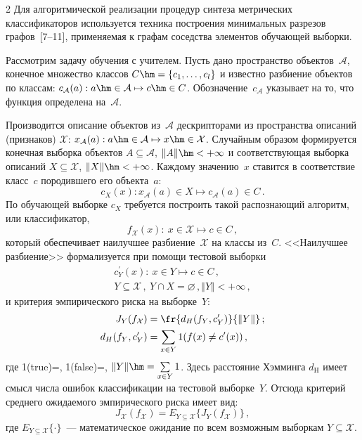 \begin{multicols}{2}
      Для алгоритмической реализации процедур синтеза метрических классификаторов 
используется техника построения минимальных разрезов графов~[7--11], %
применяемая к графам соседства элементов обучающей выборки.
      
      Рассмотрим задачу обучения с учителем. Пусть дано пространство 
объектов~$\mathcal{A}$, конечное множество классов $C\hm=\{c_1, \ldots , c_l\}$ и известно 
разбиение объектов по классам: $c_{\mathcal{A}}(a): a\hm\in\mathcal{A}\mapsto c\hm\in C$. 
Обозначение~$c_{\mathcal{A}}$ указывает на то, что функция определена на~$\mathcal{A}$.

Производится описание объектов из~$\mathcal{A}$ дескрипторами из пространства описаний 
(признаков) $\mathcal{X}$: $x_{\mathcal{A}}(a): a\hm\in\mathcal{A}\mapsto 
x\hm\in\mathcal{X}$. Случайным образом формируется конечная выборка объектов $A\subseteq 
\mathcal{A}$, $\Vert A\Vert \hm<+\infty$ и соответствующая выборка описаний 
$X\subseteq\mathcal{X}$, $\Vert X\Vert\hm<+\infty$. Каждому значению~$x$ ставится в 
соответствие класс~$c$ породившего его объекта~$a$:
$$
   c_X(x): x_{\mathcal{A}}(a)\in X\mapsto c_{\mathcal{A}}(a)\in C\,.
   $$
По обучающей выборке $c_X$ требуется построить такой распознающий алгоритм, или 
классификатор,
$$
f_{\mathcal{X}}(x):\ x\in\mathcal{X}\mapsto c\in C\,,
$$ 
который обеспечивает наилучшее разбиение~$\mathcal{X}$ на классы из~$C$. <<Наилучшее 
разбиение>> формализуется при помощи тестовой выборки
\begin{gather*}
c^\prime_Y(x):\ x\in Y\mapsto c\in C\,,\\
Y\subseteq \mathcal{X}\,,\ Y\cap X=\varnothing\,, \Vert 
Y\Vert <+\infty\,,
\end{gather*}
и критерия эмпирического риска на выборке~$Y$:
\begin{align*}
J_Y(f_{\mathcal{X}}) &= \fr{d_H(f_Y, c^\prime_Y)}{\Vert Y\Vert}\,;\\
d_H(f_Y, c_Y^\prime) &=\sum\limits_{x\in Y} {1}(f(x)\not= c^\prime(x))\,,
\end{align*}
где 1(true)\;=, 1(false)\;=, $\Vert Y\Vert\hm=\sum\limits_{x\in Y}1$. Здесь расстояние Хэмминга 
$d_{\mathrm{H}}$ имеет смысл числа ошибок классификации на тестовой выборке~$Y$.
Отсюда критерий среднего ожидаемого эмпирического риска имеет вид:
$$
J_{\mathcal{X}}(f_{\mathcal{X}})=E_{Y\subseteq \mathcal{X}} \{J_Y(f_{\mathcal{X}})\}\,,
$$
где $E_{Y\subseteq \mathcal{X}}\{\cdot\}$~--- математическое ожидание по всем возможным 
выборкам $Y\subseteq \mathcal{X}$.


\end{multicols}
